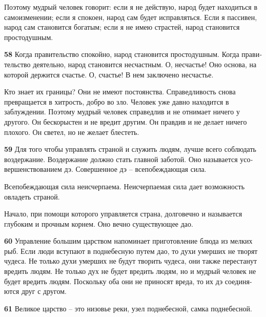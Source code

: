 \documentclass[a4paper]{article}
\begin{document}
{
Поэтому мудрый человек говорит: если я не действую, народ будет находиться в самоизменении; если я спокоен, народ сам
будет исправляться. Если я пассивен, народ сам становится богатым; если я не имею страстей, народ становится
простодушным.}


\bigskip

{\ttfamily
\foreignlanguage{russian}{\textrm{\textbf{58}}}\foreignlanguage{russian}{\textrm{ Когда правительство спокойно, народ
становится простодушным. Когда правительство деятельно, народ становится несчастным. О, несчастье! Оно основа, на
которой держится счастье. О, счастье! В нем заключено несчастье.}}}

{
Кто знает их границы? Они не имеют постоянства. Справедливость снова превращается в хитрость, добро во зло. Человек уже
давно находится в заблуждении. Поэтому мудрый человек справедлив и не отнимает ничего у другого. Он бескорыстен и не
вредит другим. Он правдив и не делает ничего плохого. Он светел, но не желает блестеть.}

{\ttfamily
\foreignlanguage{russian}{\textrm{\textbf{59}}}\foreignlanguage{russian}{\textrm{ Для того чтобы управлять страной и
служить людям, лучше всего соблюдать воздержание. Воздержание должно стать главной заботой. Оно называется
усовершенствованием дэ. Совершенное дэ – всепобеждающая сила.}}}

{
Всепобеждающая сила неисчерпаема. Неисчерпаемая сила дает возможность овладеть страной.}

{
Начало, при помощи которого управляется страна, долговечно и называется глубоким и прочным корнем. Оно вечно
существующее дао.}

{\ttfamily
\foreignlanguage{russian}{\textrm{\textbf{60}}}\foreignlanguage{russian}{\textrm{ Управление большим царством напоминает
приготовление блюда из мелких рыб. Если люди вступают в поднебесную путем дао, то духи умерших не творят чудеса. Не
только духи умерших не будут творить чудеса, они также перестанут вредить людям. Не только дух не будет вредить людям,
но и мудрый человек не будет вредить людям. Поскольку оба они не приносят вреда, то их дэ соединяются друг с другом.}}}

{\ttfamily
\foreignlanguage{russian}{\textrm{\textbf{61}}}\foreignlanguage{russian}{\textrm{ Великое царство – это низовье реки,
узел поднебесной, самка поднебесной.}}}
\end{document}
